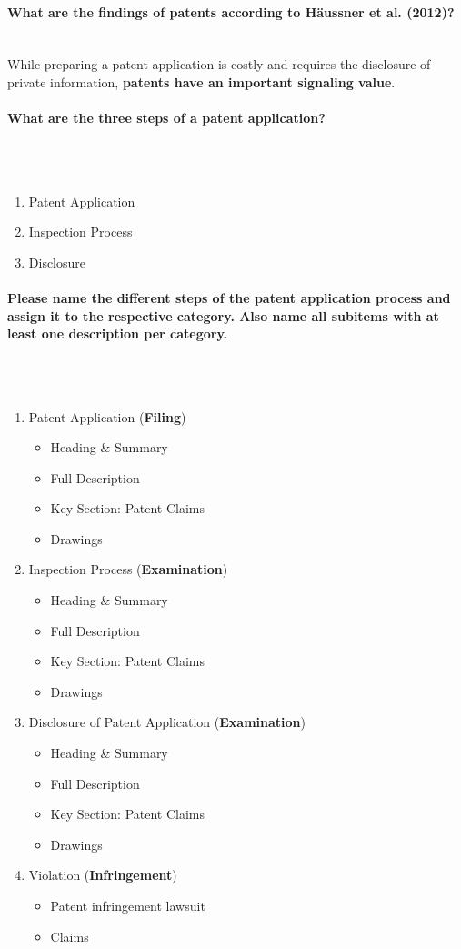 \documentclass[10pt,a4paper,noendnumber=true]{scrartcl}
\newcommand{\properparagraph}[1]{\paragraph{\textcolor{Emerald}{#1}}\mbox{}\\}
\begin{document}
\properparagraph{What are the findings of patents according to Häussner et al. (2012)?}
While preparing a patent application is costly and requires the disclosure of private information, \textbf{patents have an important signaling value}.

\properparagraph{What are the three steps of a patent application?}
\\[-6ex]
\begin{enumerate}
	\item Patent Application
	\item Inspection Process
	\item Disclosure
\end{enumerate}
	
\properparagraph{Please name the different steps of the patent application process and assign it to the respective category. Also name all subitems with at least one description per category.}
\\[-6ex]
\begin{enumerate}
	\item Patent Application (\textbf{Filing})
		\begin{itemize}
			\item Heading \& Summary
			\item Full Description
			\item Key Section: Patent Claims
			\item Drawings
		\end{itemize}
	\item Inspection Process (\textbf{Examination})
		\begin{itemize}
			\item Heading \& Summary
			\item Full Description
			\item Key Section: Patent Claims
			\item Drawings
		\end{itemize}
	\item Disclosure of Patent Application (\textbf{Examination})
		\begin{itemize}
			\item Heading \& Summary
			\item Full Description
			\item Key Section: Patent Claims
			\item Drawings
		\end{itemize}
	\item Violation (\textbf{Infringement})
		\begin{itemize}
			\item Patent infringement lawsuit
			\item Claims
		\end{itemize}
\end{enumerate}
\end{document}
